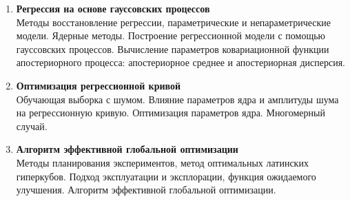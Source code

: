 \documentclass[12pt,oneside,openany]{article}
\begin{document}
\begin{enumerate}
  \item \textbf{Регрессия на основе гауссовских процессов} \\
  Методы восстановление регрессии, параметрические и непараметрические модели. Ядерные методы. Построение регрессионной модели с помощью гауссовских процессов. Вычисление параметров ковариационной функции апостериорного процесса: апостериорное среднее и апостериорная дисперсия.

  \item \textbf{Оптимизация регрессионной кривой} \\
  Обучающая выборка с шумом. Влияние параметров ядра и амплитуды шума на регрессионную кривую. Оптимизация параметров ядра. Многомерный случай.

  \item \textbf{Алгоритм эффективной глобальной оптимизации} \\
  Методы планирования экспериментов, метод оптимальных латинских гиперкубов. Подход эксплуатации и эксплорации, функция ожидаемого улучшения. Алгоритм эффективной глобальной оптимизации.

\end{enumerate}
\end{document}
